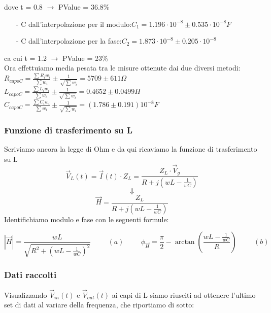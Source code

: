 \documentclass{article}
\theoremstyle{definition}
\begin{document}
dove t = 0.8 \(\rightarrow\) PValue = 36.8\% \\

\begin{enumerate}
    \item[-] C dall'interpolazione per il modulo:\(C_{1} = 1.196 \cdot 10^{-8} \pm 0.535 \cdot 10^{-8} F\)
    \item[-]  C dall'interpolazione per la fase:\(C_{2} = 1.873 \cdot 10^{-8} \pm 0.205 \cdot 10^{-8}\)
 
\end{enumerate}


ca cui t = 1.2 \(\rightarrow\) PValue = 23\% \\

Ora effettuiamo media pesata tra le misure ottenute dai due diversi metodi:\\

\(R_{capoC} = \frac{\sum R_{i}w_{i}}{\sum w_{i}} \pm \frac{1}{\sqrt{\sum w_{i}}}= 5709 \pm 611 \Omega\) \\


\(L_{capoC} = \frac{\sum L_{i}w_{i}}{\sum w_{i}} \pm \frac{1}{\sqrt{\sum w_{i}}}= 0.4652 \pm 0.0499 H\) \\

\(C_{capoC} = \frac{\sum C_{i}w_{i}}{\sum w_{i}} \pm \frac{1}{\sqrt{\sum w_{i}}}= (1.786 \pm 0.191) 10^{-8}  F\)\\

\pagebreak
\subsubsection{Funzione di trasferimento su L}
Scriviamo ancora la legge di Ohm e da qui ricaviamo la funzione di trasferimento su L
\[\vec{V}_{L}(t) = \vec{I}(t)\cdot Z_{L} = \frac{Z_{L}\cdot \vec{V}_{g}}{R + j(wL-\frac{1}{wC})}\]
\[\Downarrow\]
\[\vec{H} = \frac{Z_{L}}{R + j(wL-\frac{1}{wC})}\]
\noindent Identifichiamo modulo e fase con le seguenti formule:

\[\left|\vec{H}\right|= \frac{wL}{\sqrt{R^2+(wL - \frac{1}{wC})^{2}}}\hspace{1cm} (a)\hspace{1cm} \phi_{\vec{H}} = \frac{\pi}{2} - \arctan\left(\frac{wL- \frac{1}{wC}}{R}\right)\hspace{1cm} (b) \]


\subsubsection*{Dati raccolti}
Visualizzando \(\vec{V}_{in}(t)\) e \(\vec{V}_{out}(t)\) ai capi di L siamo riusciti ad ottenere l'ultimo set di dati al variare della frequenza, che riportiamo di sotto: 
\end{document}
